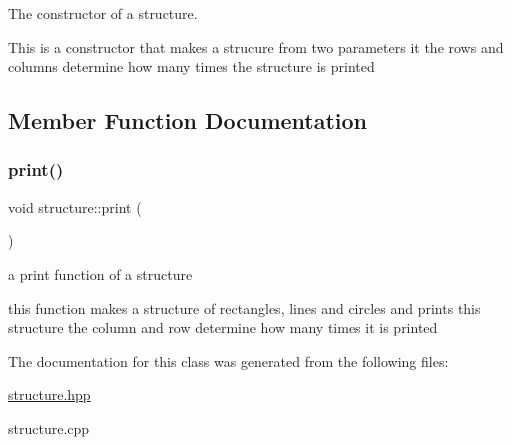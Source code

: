 The constructor of a structure. 

This is a constructor that makes a strucure from two parameters it the rows and columns determine how many times the structure is printed 

\subsection{Member Function Documentation}
\mbox{\label{classstructure_a0ea72a58f3ccac0a64a0f9b676c1776c}} 
\subsubsection{\texorpdfstring{print()}{print()}}
{\footnotesize\ttfamily void structure\+::print (\begin{DoxyParamCaption}{ }\end{DoxyParamCaption})}



a print function of a structure 

this function makes a structure of rectangles, lines and circles and prints this structure the column and row determine how many times it is printed 

The documentation for this class was generated from the following files\+:\begin{DoxyCompactItemize}
\item 
\hyperlink{structure_8hpp}{structure.\+hpp}\item 
structure.\+cpp\end{DoxyCompactItemize}
